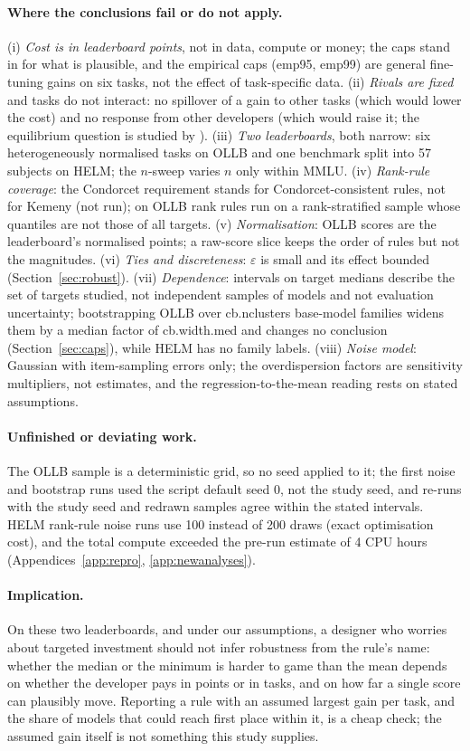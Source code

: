 \paragraph{Where the conclusions fail or do not apply.}
(i) \emph{Cost is in leaderboard points}, not in data, compute or money; the caps stand in for what is plausible, and the empirical caps (\textsf{emp95}, \textsf{emp99}) are general fine-tuning gains on six tasks, not the effect of task-specific data. (ii) \emph{Rivals are fixed} and tasks do not interact: no spillover of a gain to other tasks (which would lower the cost) and no response from other developers (which would raise it; the equilibrium question is studied by \citet{chen2026leaderboard}). (iii) \emph{Two leaderboards}, both narrow: six heterogeneously normalised tasks on OLLB and one benchmark split into 57 subjects on HELM; the $n$-sweep varies $n$ only within MMLU. (iv) \emph{Rank-rule coverage}: the Condorcet requirement stands for Condorcet-consistent rules, not for Kemeny (not run); on OLLB rank rules run on a rank-stratified sample whose quantiles are not those of all targets. (v) \emph{Normalisation}: OLLB scores are the leaderboard's normalised points; a raw-score slice keeps the order of rules but not the magnitudes. (vi) \emph{Ties and discreteness}: $\varepsilon$ is small and its effect bounded (Section~\ref{sec:robust}). (vii) \emph{Dependence}: intervals on target medians describe the set of targets studied, not independent samples of models and not evaluation uncertainty; bootstrapping OLLB over \num{cb.nclusters} base-model families widens them by a median factor of \num{cb.width.med} and changes no conclusion (Section~\ref{sec:caps}), while HELM has no family labels. (viii) \emph{Noise model}: Gaussian with item-sampling errors only; the overdispersion factors are sensitivity multipliers, not estimates, and the regression-to-the-mean reading rests on stated assumptions.

\paragraph{Unfinished or deviating work.}
The OLLB sample is a deterministic grid, so no seed applied to it; the first noise and bootstrap runs used the script default seed 0, not the study seed, and re-runs with the study seed and redrawn samples agree within the stated intervals. HELM rank-rule noise runs use 100 instead of 200 draws (exact optimisation cost), and the total compute exceeded the pre-run estimate of 4 CPU hours (Appendices~\ref{app:repro}, \ref{app:newanalyses}).

\paragraph{Implication.}
On these two leaderboards, and under our assumptions, a designer who worries about targeted investment should not infer robustness from the rule's name: whether the median or the minimum is harder to game than the mean depends on whether the developer pays in points or in tasks, and on how far a single score can plausibly move. Reporting a rule with an assumed largest gain per task, and the share of models that could reach first place within it, is a cheap check; the assumed gain itself is not something this study supplies.
